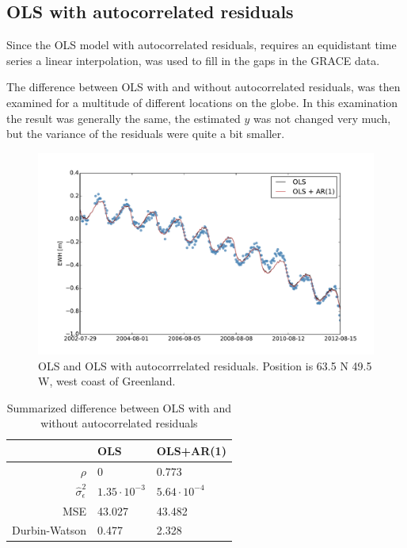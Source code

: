 
\subsection{OLS with autocorrelated residuals}
Since the OLS model with autocorrelated residuals, requires an equidistant time series a linear interpolation, was used to fill in the gaps in the GRACE data. 

The difference between OLS with and without autocorrelated residuals, was then examined for a multitude of different locations on the globe. In this examination the result was generally the same, the estimated $\hat{y}$ was not changed very much, but the variance of the residuals were quite a bit smaller.

\begin{figure}[H]
\centering
\includegraphics[width=1.0\textwidth]{figures/ar-compare}
\caption{OLS and OLS with autocorrrelated residuals. Position is 63.5 N 49.5 W, west coast of Greenland.}
\label{fig:ar-compare}
\end{figure}

\begin{table}[H]
\centering
\begin{tabular}{r | l l}
                             & OLS    & OLS+AR(1) \\ \hline
$\rho$		 & 0          & 0.773 \\
$\hat{\sigma}_\epsilon^2$ & $1.35 \cdot 10^{-3}$ & $ 5.64 \cdot 10^{-4}$ \\
MSE                   & 43.027 & 43.482 \\
Durbin-Watson & 0.477 & 2.328
\end{tabular}
\caption{Summarized difference between OLS with and without autocorrelated residuals}
\label{table:ar-compare}
\end{table}

